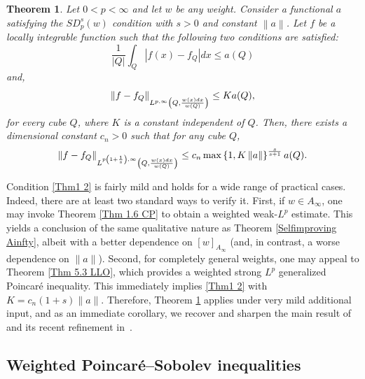 \documentclass[reqno, 10pt, oneside]{amsart}
\numberwithin{equation}{section}
\newcommand{\strt}[1]{\rule{0pt}{#1}}
\newtheorem{theorem}{Theorem}
\numberwithin{theorem}{section}
\newcommand{\1}{{\rm 1\hspace*{-0.4ex}%
\rule{0.1ex}{1.52ex}\hspace*{0.2ex}}}
\begin{document}
\begin{theorem}\label{Thm1}
	Let $0< p <\infty$ and let $w$ be any weight. Consider a functional $a$ satisfying the $SD^s_p(w)$ condition with $s>0$ and constant $\left\| a \right\| $. Let $f$ be a locally integrable function such that the following two conditions are satisfied: 
		\begin{equation}\label{Thm1 1}
			\frac{1}{|Q|} \int_Q |f(x)-f_Q|dx \le a(Q)
		\end{equation}
		and,
		\begin{equation}\label{Thm1 2}
			\left\| f - f_Q\right\| _{\strt{2.3ex} L^{p,\infty}\left( Q, \frac{w(x)dx}{w(Q)}\right) } \le K a(Q),
		\end{equation}
		for every cube $Q$, where $K$ is a constant independent of $Q$. Then, there exists a dimensional constant $c_n>0$ such that for any cube $Q$, 
		\begin{equation*} 
			\left\| f - f_Q\right\| _{\strt{2.3ex} L^{p\left(1+\frac{1}{s}\right),\infty}\left( Q, \frac{w(x)dx}{w(Q)}\right) } \le c_n  \max \left\lbrace 1, K \left\| a \right\| \right\rbrace ^\frac{s}{s+1} a(Q).
		\end{equation*}
\end{theorem}







%
Condition \eqref{Thm1 2} is fairly mild and holds for a wide range of practical cases. Indeed, there are at least two standard ways to verify it. First, if $w\in A_\infty$, one may invoke Theorem \ref{Thm 1.6 CP} to obtain a weighted weak-$L^p$ estimate. This yields a conclusion of the same qualitative nature as Theorem \ref{Selfimproving Ainfty}, albeit with a better dependence on $[w]_{A_\infty}$ (and, in contrast, a worse dependence on $\|a\|$). Second, for completely general weights, one may appeal to Theorem \ref{Thm 5.3 LLO}, which provides a weighted strong $L^p$ generalized Poincaré inequality. This immediately implies \eqref{Thm1 2} with $K = c_n(1+s)\|a\|$. Therefore, Theorem \ref{Thm1} applies under very mild additional input, and as an immediate corollary, we recover and sharpen the main result of~\cite{PR} and its recent refinement in~\cite{LLO}. 





\subsection{Weighted Poincaré--Sobolev inequalities}\label{Section PS}
\end{document}
